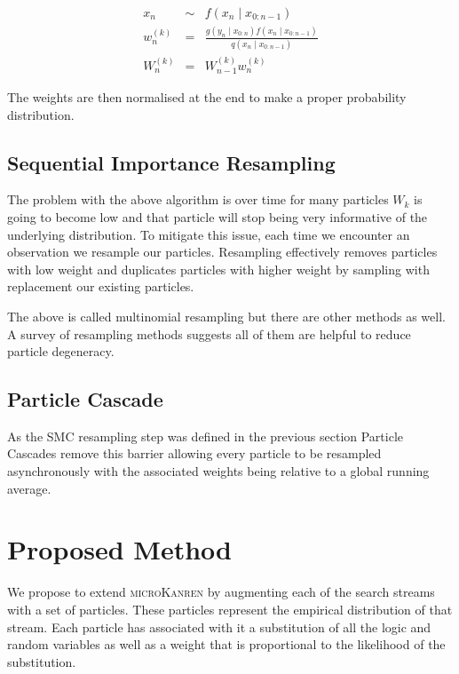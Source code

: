 \documentclass[
]{ceurart}
\begin{document}
\begin{eqnarray}
  x_n &\sim& f(x_n \mid x_{0:n-1}) \\
  w_n^{(k)} &=& \frac{g(y_n \mid x_{0:n})f(x_n \mid x_{0:n-1})}{q(x_n \mid x_{0:n-1})} \\
  W_n^{(k)} &=& W_{n-1}^{(k)} w_n^{(k)}
\end{eqnarray}

The weights are then normalised at the end to make a proper probability distribution.

\subsection{Sequential Importance Resampling}

The problem with the above algorithm is over time for many particles
$W_k$ is going to become low and that particle will stop being very
informative of the underlying distribution. To mitigate this issue,
each time we encounter an observation we resample our particles. Resampling
effectively removes particles with low weight and duplicates particles
with higher weight by sampling with replacement our existing particles.

The above is called multinomial resampling but there are other methods
as well. A survey\cite{douc2005comparison} of resampling methods
suggests all of them are helpful to reduce particle degeneracy.

\subsection{Particle Cascade}

As the SMC resampling step was defined in the previous section
Particle Cascades \cite{PaigeWDT14} remove this barrier allowing
every particle to be resampled asynchronously with the associated
weights being relative to a global running average. %

\section{Proposed Method}

We propose to extend \textsc{microKanren} by augmenting each of the
search streams with a set of particles. These particles represent the
empirical distribution of that stream. Each particle has associated
with it a substitution of all the logic and random variables as well
as a weight that is proportional to the likelihood of the substitution.
\end{document}

